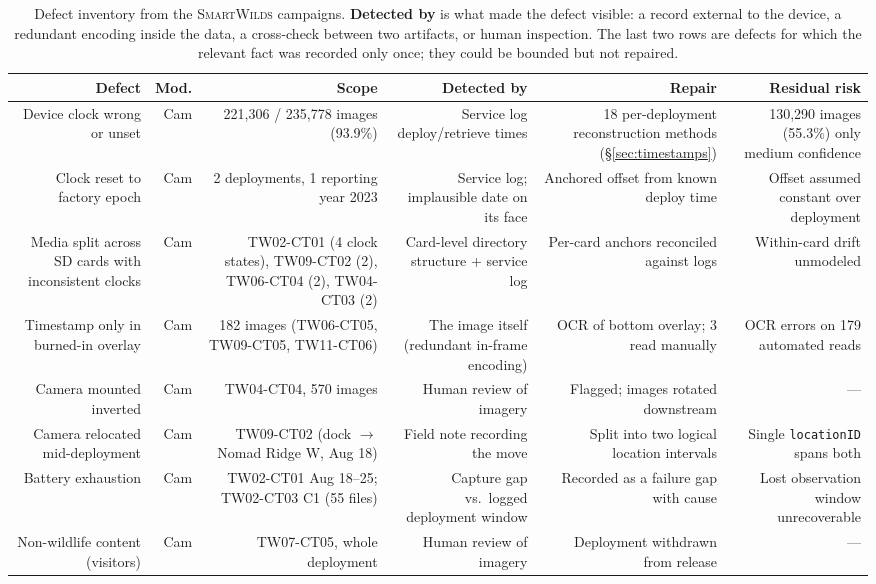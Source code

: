 \documentclass[sigconf]{acmart}
\newcommand{\smartwilds}{\textsc{SmartWilds}\xspace}
\begin{document}
\begin{table}[t]
\caption{Defect inventory from the \smartwilds campaigns.
\textbf{Detected by} is what made the defect visible: a record external
to the device, a redundant encoding inside the data, a cross-check
between two artifacts, or human inspection. The last two rows are
defects for which the relevant fact was recorded only once; they could
be bounded but not repaired.}
\label{tab:defects}
\footnotesize
\begin{tabularx}{\textwidth}{R{1.09}R{0.39}R{1.09}R{1.09}R{1.17}R{1.17}}
\toprule
\textbf{Defect} & \textbf{Mod.} & \textbf{Scope} & \textbf{Detected by} & \textbf{Repair} & \textbf{Residual risk} \\
\midrule
Device clock wrong or unset & Cam & 221{,}306 / 235{,}778 images (93.9\%) & Service log deploy/retrieve times & 18 per-deployment reconstruction methods (\S\ref{sec:timestamps}) & 130{,}290 images (55.3\%) only medium confidence \\
Clock reset to factory epoch & Cam & 2 deployments, 1 reporting year 2023 & Service log; implausible date on its face & Anchored offset from known deploy time & Offset assumed constant over deployment \\
Media split across SD cards with inconsistent clocks & Cam & TW02-CT01 (4 clock states), TW09-CT02 (2), TW06-CT04 (2), TW04-CT03 (2) & Card-level directory structure + service log & Per-card anchors reconciled against logs & Within-card drift unmodeled \\
Timestamp only in burned-in overlay & Cam & 182 images (TW06-CT05, TW09-CT05, TW11-CT06) & The image itself (redundant in-frame encoding) & OCR of bottom overlay; 3 read manually & OCR errors on 179 automated reads \\
Camera mounted inverted & Cam & TW04-CT04, 570 images & Human review of imagery & Flagged; images rotated downstream & --- \\
Camera relocated mid-deployment & Cam & TW09-CT02 (dock $\to$ Nomad Ridge W, Aug 18) & Field note recording the move & Split into two logical location intervals & Single \texttt{locationID} spans both \\
Battery exhaustion & Cam & TW02-CT01 Aug 18--25; TW02-CT03 C1 (55 files) & Capture gap vs.\ logged deployment window & Recorded as a failure gap with cause & Lost observation window unrecoverable \\
Non-wildlife content (visitors) & Cam & TW07-CT05, whole deployment & Human review of imagery & Deployment withdrawn from release & --- \\

\end{tabularx}
\end{table}
\end{document}
